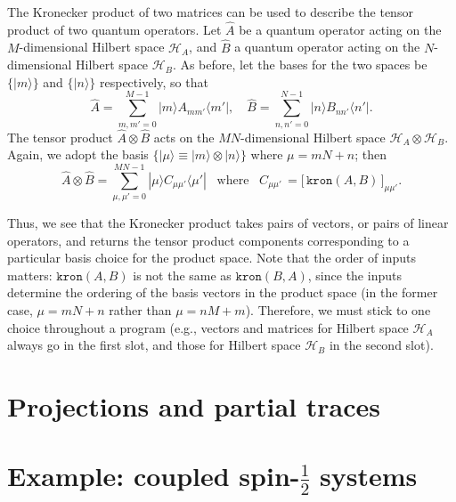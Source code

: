 \documentclass[pra,12pt]{revtex4}
\begin{document}
The Kronecker product of two matrices can be used to describe the
tensor product of two quantum operators.  Let $\hat{A}$ be a quantum
operator acting on the $M$-dimensional Hilbert space $\mathscr{H}_A$,
and $\hat{B}$ a quantum operator acting on the $N$-dimensional Hilbert
space $\mathscr{H}_B$.  As before, let the bases for the two spaces be
$\{|m\rangle\}$ and $\{|n\rangle\}$ respectively, so that
$$\hat{A} = \sum_{m,m'=0}^{M-1}  |m\rangle A_{mm'} \langle m'|, \quad \hat{B} = \sum_{n,n'=0}^{N-1} |n\rangle B_{nn'}\langle n'|.$$
The tensor product $\hat{A}\otimes\hat{B}$ acts on the
$MN$-dimensional Hilbert space $\mathscr{H}_A\otimes \mathscr{H}_B$.
Again, we adopt the basis $\big\{|\mu\rangle \equiv |m\rangle\otimes
|n\rangle \big\}$ where $\mu = mN+n$; then
$$\hat{A}\otimes\hat{B} = \sum_{\mu,\mu'=0}^{MN-1} |\mu\rangle C_{\mu\mu'} \langle\mu'| \;\;\; \mathrm{where}\;\;\; C_{\mu\mu'}\, = \big[\,\texttt{kron}(A,B)\,\big]_{\mu\mu'}.$$

Thus, we see that the Kronecker product takes pairs of vectors, or
pairs of linear operators, and returns the tensor product components
corresponding to a particular basis choice for the product space.
Note that the order of inputs matters: $\texttt{kron}(A,B)$ is not the
same as $\texttt{kron}(B,A)$, since the inputs determine the ordering
of the basis vectors in the product space (in the former case, $\mu =
mN+n$ rather than $\mu = nM+m$).  Therefore, we must stick to one
choice throughout a program (e.g., vectors and matrices for Hilbert
space $\mathscr{H}_A$ always go in the first slot, and those for
Hilbert space $\mathscr{H}_B$ in the second slot).

\section{Projections and partial traces}


\section{Example: coupled spin-$\frac{1}{2}$ systems}
\end{document}
